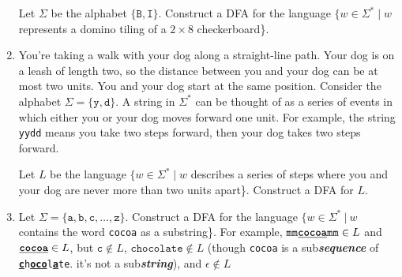 \documentclass{article}
\renewcommand{\(}{\left(}
\renewcommand{\)}{\right)}
\theoremstyle{plain}
\theoremstyle{plain}
\theoremstyle{definition}
\renewcommand{\emph}[1]{\textit{\textbf{#1}}}
\newcommand{\ttt}[1]{\texttt{#1}}
\newcommand{\match}[1]{\textbf{\underline{#1}}}
\begin{document}
\begin{enumerate}[label*=\roman*.,ref=\roman*]
\begin{minipage}[t]{.4\textwidth}
    \end{minipage}

    Let $\Sigma$ be the alphabet $\{\ttt{B}, \ttt{I}\}$. Construct a DFA for the language $\{ w \in \Sigma^* \mid w$ represents a domino tiling of a $2 \times 8$ checkerboard\}.
    
    \item You're taking a walk with your dog along a straight-line path. Your dog is on a leash of length two, so the distance between you and your dog can be at most two units. You and your dog start at the same position. Consider the alphabet $\Sigma = \{\ttt{y}, \ttt{d}\}$. A string in $\Sigma^*$ can be thought of as a series of events in which either you or your dog moves forward one unit. For example, the string \ttt{yydd} means you take two steps forward, then your dog takes two steps forward.
    
    Let $L$ be the language $\{ w \in \Sigma^* \mid w$ describes a series of steps where you and your dog are never more than two units apart\}. Construct a DFA for $L$.
    
    \item Let $\Sigma = \{\ttt{a}, \ttt{b}, \ttt{c}, \ldots, \ttt{z}\}$. Construct a DFA for the language $\{ w \in \Sigma^*\ |\ w$ contains the word \ttt{cocoa} as a substring\}. For example, $\ttt{mm\match{cocoa}mm} \in L$ and $\ttt{\match{cocoa}} \in L$, but $\ttt{c} \notin L$, $\ttt{chocolate} \notin L$ (though \ttt{cocoa} is a sub\emph{sequence} of \ttt{\match{c}h\match{oco}l\match{a}te}. it's not a sub\emph{string}), and $\epsilon \notin L$
    

\end{enumerate}
\end{document}
